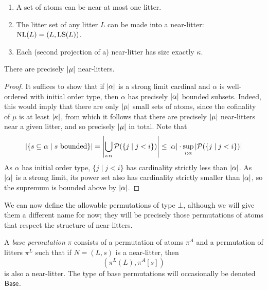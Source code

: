 \begin{remarks}\mbox{\negthinspace}
    \label{rk:mk_near_litter}
    \begin{enumerate}
        \item {} A set of atoms can be near at most one litter.
        \item {} The litter set of any litter \( L \) can be made into a near-litter: \( \operatorname{NL}(L) = (L, \operatorname{LS}(L)) \).
        \item {} Each (second projection of a) near-litter has size exactly \( \kappa \).
    \end{enumerate}
\end{remarks}
\begin{lemma}
    There are precisely \( \left|\mu\right| \) near-litters.
\end{lemma}
\begin{proof}
    It suffices to show that if \( \left|\alpha\right| \) is a strong limit cardinal and \( \alpha \) is well-ordered with initial order type, then \( \alpha \) has precisely \( \left|\alpha\right| \) bounded subsets.
    Indeed, this would imply that there are only \( \left|\mu\right| \) small sets of atoms, since the cofinality of \( \mu \) is at least \( \left|\kappa\right| \), from which it follows that there are precisely \( \left|\mu\right| \) near-litters near a given litter, and so precisely \( \left|\mu\right| \) in total.
    Note that
    \[ \left|\{ s \subseteq \alpha \mid s \text{ bounded} \}\right| = \left|\bigcup_{i : \alpha} \mathcal P(\{ j \mid j < i \})\right| \leq \left|\alpha\right| \cdot \sup_{i : \alpha} \left|\mathcal P(\{ j \mid j < i \})\right| \]
    As \( \alpha \) has initial order type, \( \{ j \mid j < i \} \) has cardinality strictly less than \( \left|\alpha\right| \).
    As \( \left|\alpha\right| \) is a strong limit, its power set also has cardinality strictly smaller than \( \left|\alpha\right| \), so the supremum is bounded above by \( \left|\alpha\right| \).
\end{proof}
We can now define the allowable permutations of type \( \bot \), although we will give them a different name for now; they will be precisely those permutations of atoms that respect the structure of near-litters.
\begin{definition}
    A \emph{base permutation} \( \pi \) consists of a permutation of atoms \( \pi^A \) and a permutation of litters \( \pi^L \) such that if \( N = (L, s) \) is a near-litter, then
    \[ (\pi^L(L), \pi^A[s]) \]
    is also a near-litter.
    The type of base permutations will occasionally be denoted \( \mathsf{Base} \).
\end{definition}
